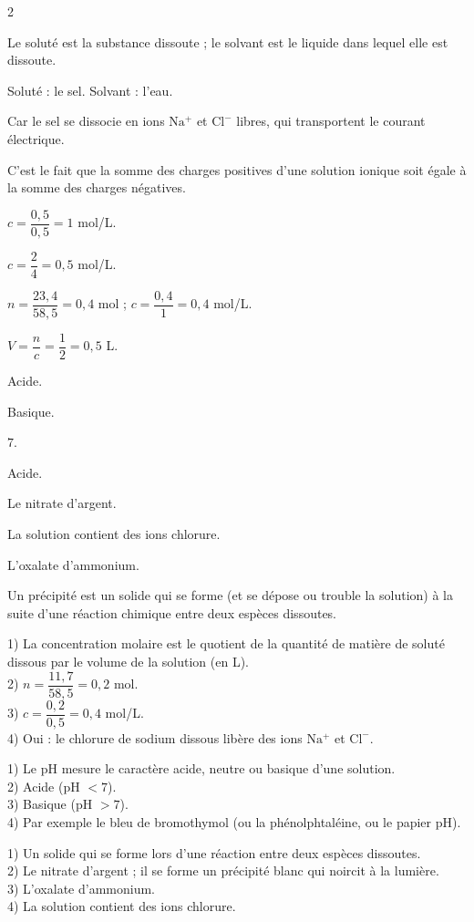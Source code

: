 \begin{multicols}{2}

Le soluté est la substance dissoute ; le solvant est le liquide dans lequel elle est
dissoute.

Soluté : le sel. Solvant : l'eau.

Car le sel se dissocie en ions $\mathrm{Na^+}$ et $\mathrm{Cl^-}$ libres, qui transportent
le courant électrique.

C'est le fait que la somme des charges positives d'une solution ionique soit égale à la
somme des charges négatives.

$c=\dfrac{0{,}5}{0{,}5}=1$ mol/L.

$c=\dfrac24=0{,}5$ mol/L.

$n=\dfrac{23{,}4}{58{,}5}=0{,}4$ mol ; $c=\dfrac{0{,}4}{1}=0{,}4$ mol/L.

$V=\dfrac nc=\dfrac12=0{,}5$ L.

Acide.

Basique.

$7$.

Acide.

Le nitrate d'argent.

La solution contient des ions chlorure.

L'oxalate d'ammonium.

Un précipité est un solide qui se forme (et se dépose ou trouble la solution) à la suite
d'une réaction chimique entre deux espèces dissoutes.

1) La concentration molaire est le quotient de la quantité de matière de soluté dissous
par le volume de la solution (en L).\\
2) $n=\dfrac{11{,}7}{58{,}5}=0{,}2$ mol.\\
3) $c=\dfrac{0{,}2}{0{,}5}=0{,}4$ mol/L.\\
4) Oui : le chlorure de sodium dissous libère des ions $\mathrm{Na^+}$ et $\mathrm{Cl^-}$.

1) Le pH mesure le caractère acide, neutre ou basique d'une solution.\\
2) Acide (pH $<7$).\\
3) Basique (pH $>7$).\\
4) Par exemple le bleu de bromothymol (ou la phénolphtaléine, ou le papier pH).

1) Un solide qui se forme lors d'une réaction entre deux espèces dissoutes.\\
2) Le nitrate d'argent ; il se forme un précipité blanc qui noircit à la lumière.\\
3) L'oxalate d'ammonium.\\
4) La solution contient des ions chlorure.

\end{multicols}
\exercicesBanner
